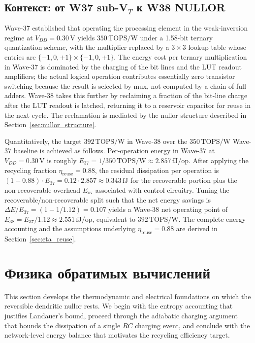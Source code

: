 \subsection{Контекст: от W37 sub-V$_T$ к W38 NULLOR}
\label{subsec:from_w37_to_w38}

Wave-37 established that operating the processing element in the weak-inversion
regime at $V_{DD}=0.30\,\text{V}$ yields $350\,\text{TOPS/W}$ under a 1.58-bit ternary
quantization scheme, with the multiplier replaced by a $3\times3$ lookup table whose
entries are $\{-1,0,+1\} \times \{-1,0,+1\}$.  The energy cost per ternary
multiplication in Wave-37 is dominated by the charging of the bit lines and the LUT
readout amplifiers; the actual logical operation contributes essentially zero
transistor switching because the result is selected by mux, not computed by a chain
of full adders.  Wave-38 takes this further by reclaiming a fraction of the bit-line
charge after the LUT readout is latched, returning it to a reservoir capacitor for
reuse in the next cycle.  The reclamation is mediated by the nullor structure
described in Section~\ref{sec:nullor_structure}.

Quantitatively, the target $392\,\text{TOPS/W}$ in Wave-38 over the $350\,\text{TOPS/W}$
Wave-37 baseline is achieved as follows.  Per-operation energy in Wave-37 at
$V_{DD}=0.30\,\text{V}$ is roughly $E_{37} = 1/350 \,\text{TOPS/W} \approx 2.857\,\text{fJ/op}$.
After applying the recycling fraction $\eta_{\text{reuse}} = 0.88$, the residual
dissipation per operation is $(1-0.88) \cdot E_{37} = 0.12 \cdot 2.857 \approx 0.343\,\text{fJ}$
for the recoverable portion plus the non-recoverable overhead $E_{\text{ov}}$ associated
with control circuitry.  Tuning the recoverable/non-recoverable split such that the
net energy savings is $\Delta E / E_{37} = (1 - 1/1.12) = 0.107$ yields a Wave-38 net
operating point of $E_{38} = E_{37} / 1.12 \approx 2.551\,\text{fJ/op}$, equivalent to
$392\,\text{TOPS/W}$.  The complete energy accounting and the assumptions underlying
$\eta_{\text{reuse}} = 0.88$ are derived in Section~\ref{sec:eta_reuse}.

\section{Физика обратимых вычислений}
\label{sec:nullor_physics}

This section develops the thermodynamic and electrical foundations on which the
reversible dendritic nullor rests.  We begin with the entropy accounting that justifies
Landauer's bound, proceed through the adiabatic charging argument that bounds the
dissipation of a single $RC$ charging event, and conclude with the network-level
energy balance that motivates the recycling efficiency target.

